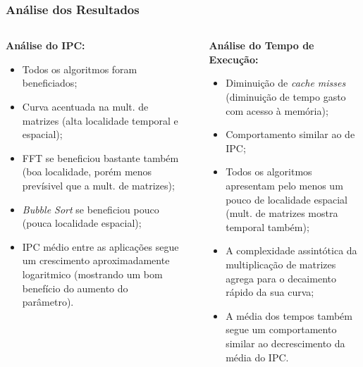 \documentclass{beamer}
\begin{document}
    \begin{frame}
        \frametitle{Análise dos Resultados}

        \begin{columns}
            \begin{column}{0.45\textwidth}
                \begin{center}
                    \large
                    \textbf{Análise do IPC:}
                \end{center}
                \begin{itemize}
                    \footnotesize
                    \justifying
                    \item Todos os algoritmos foram beneficiados;
                    \item Curva acentuada na mult. de matrizes (alta localidade temporal e espacial);
                    \item FFT se beneficiou bastante também (boa localidade, porém menos prevísivel que a mult. de matrizes);
                    \item \textit{Bubble Sort} se beneficiou pouco (pouca localidade espacial);
                    \item IPC médio entre as aplicações segue um crescimento aproximadamente logaritmico (mostrando um bom benefício do aumento do parâmetro).
                \end{itemize}
            \end{column}

            \begin{column}{0.01\textwidth}
                \rule{.1mm}{0.875\textheight}
            \end{column}

            \begin{column}{0.45\textwidth}
                \begin{center}
                    \large
                    \textbf{Análise do Tempo de Execução:}
                \end{center}
                \begin{itemize}
                    \footnotesize
                    \justifying
                    \item Diminuição de \textit{cache misses} (diminuição de tempo gasto com acesso à memória);
                    \item Comportamento similar ao de IPC;
                    \item Todos os algoritmos apresentam pelo menos um pouco de localidade espacial (mult. de matrizes mostra temporal também);
                    \item A complexidade assintótica da multiplicação de matrizes agrega para o decaimento rápido da sua curva;
                    \item A média dos tempos também segue um comportamento similar ao decrescimento da média do IPC.
                \end{itemize}
            \end{column}
        \end{columns}
    \end{frame}
\end{document}
